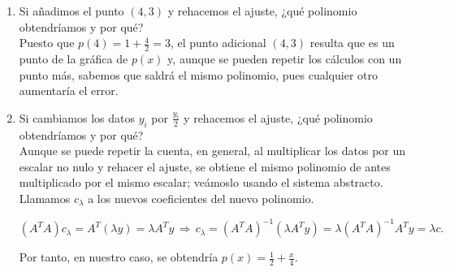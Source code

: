 \documentclass[12pt]{article}
\begin{document}
\begin{ejercicio}[2 puntos]
\begin{enumerate}[label=\alph*)]
			\item Si añadimos el punto $(4, 3)$ y rehacemos el ajuste, ¿qué polinomio obtendríamos y por qué? \\
			
			Puesto que $p(4) = 1 + \frac{4}{2} = 3$, el punto adicional $(4, 3)$ resulta que es un punto de la gráfica de $p(x)$ y, aunque se pueden repetir los cálculos con un punto más, sabemos que saldrá el mismo polinomio, pues cualquier otro aumentaría el error.
			
			
			\item Si cambiamos los datos $y_i$ por $\displaystyle \frac{y_i}{2}$ y rehacemos el ajuste, ¿qué polinomio obtendríamos y por qué? \\
			
			Aunque se puede repetir la cuenta, en general, al multiplicar los datos por un escalar no nulo y rehacer el ajuste, se obtiene el mismo polinomio de antes multiplicado por el mismo escalar; veámoslo usando el sistema abstracto. Llamamos $c_{\lambda}$ a los nuevos coeficientes del nuevo polinomio.
			
			$$(A^T A)c_{\lambda} = A^T(\lambda y) = \lambda A^T y \, \Rightarrow \, c_{\lambda} = (A^T A)^{-1} (\lambda A^T y) = \lambda (A^TA)^{-1}A^Ty=\lambda c.$$
			
			Por tanto, en nuestro caso, se obtendría $p(x) = \displaystyle \frac{1}{2} + \frac{x}{4}.$
			
			
		\end{enumerate}
	\end{ejercicio}
\end{document}
